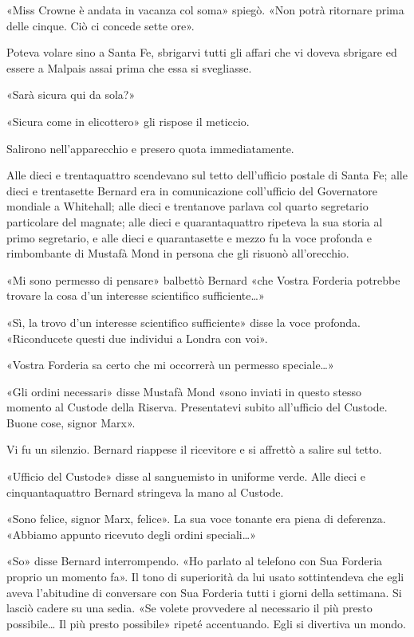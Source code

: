 \documentclass[
a5paper, %
10pt, %
twoside, 
onecolumn, %
openany, %
]{memoir}
\begin{document}
«Miss Crowne è andata in vacanza col soma» spiegò. «Non potrà ritornare prima delle cinque. Ciò ci concede sette ore».

Poteva volare sino a Santa Fe, sbrigarvi tutti gli affari che vi doveva sbrigare ed essere a Malpais assai prima che essa si svegliasse.

«Sarà sicura qui da sola?»

«Sicura come in elicottero» gli rispose il meticcio.

Salirono nell’apparecchio e presero quota immediatamente.

Alle dieci e trentaquattro scendevano sul tetto dell’ufficio postale di Santa Fe; alle dieci e trentasette Bernard era in comunicazione coll’ufficio del Governatore mondiale a Whitehall; alle dieci e trentanove parlava col quarto segretario particolare del magnate; alle dieci e quarantaquattro ripeteva la sua storia al primo segretario, e alle dieci e quarantasette e mezzo fu la voce profonda e rimbombante di Mustafà Mond in persona che gli risuonò all’orecchio.

«Mi sono permesso di pensare» balbettò Bernard «che Vostra Forderia potrebbe trovare la cosa d’un interesse scientifico sufficiente…»

«Sì, la trovo d’un interesse scientifico sufficiente» disse la voce profonda. «Riconducete questi due individui a Londra con voi».

«Vostra Forderia sa certo che mi occorrerà un permesso speciale…»

«Gli ordini necessari» disse Mustafà Mond «sono inviati in questo stesso momento al Custode della Riserva. Presentatevi subito all’ufficio del Custode. Buone cose, signor Marx».

Vi fu un silenzio. Bernard riappese il ricevitore e si affrettò a salire sul tetto.

«Ufficio del Custode» disse al sanguemisto in uniforme verde. Alle dieci e cinquantaquattro Bernard stringeva la mano al Custode.

«Sono felice, signor Marx, felice». La sua voce tonante era piena di deferenza. «Abbiamo appunto ricevuto degli ordini speciali…»

«So» disse Bernard interrompendo. «Ho parlato al telefono con Sua Forderia proprio un momento fa». Il tono di superiorità da lui usato sottintendeva che egli aveva l’abitudine di conversare con Sua Forderia tutti i giorni della settimana. Si lasciò cadere su una sedia. «Se volete provvedere al necessario il più presto possibile… Il più presto possibile» ripeté accentuando. Egli si divertiva un mondo.
\end{document}
